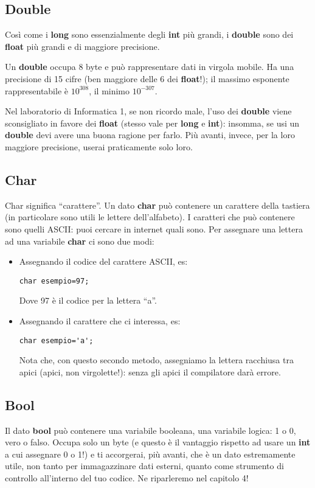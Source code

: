 	
	
	\subsection{Double}
	Così come i \textbf{long} sono essenzialmente degli \textbf{int} più grandi, i \textbf{double} sono dei \textbf{float} più grandi e di maggiore precisione.
	
	Un \textbf{double} occupa 8 byte e può rappresentare dati in virgola mobile. Ha una precisione di 15 cifre (ben maggiore delle 6 dei \textbf{float}!); il massimo esponente rappresentabile è $10^{308}$, il minimo $10^{-307}$.
	
	Nel laboratorio di Informatica 1, se non ricordo male, l'uso dei \textbf{double} viene sconsigliato in favore dei \textbf{float} (stesso vale per \textbf{long} e \textbf{int}): insomma, se usi un \textbf{double} devi avere una buona ragione per farlo. Più avanti, invece, per la loro maggiore precisione, userai praticamente solo loro.
	
	\subsection{Char}
	Char significa ``carattere''. Un dato \textbf{char} può contenere un carattere della tastiera (in particolare sono utili le lettere dell'alfabeto). I caratteri che può contenere sono quelli ASCII: puoi cercare in internet quali sono.
	Per assegnare una lettera ad una variabile \textbf{char} ci sono due modi: 
	\begin{itemize}
		\item Assegnando il codice del carattere ASCII, es:
		\begin{lstlisting}
char esempio=97;
		\end{lstlisting}
		Dove 97 è il codice per la lettera ``a''.
		\item Assegnando il carattere che ci interessa, es:
		\begin{lstlisting}
char esempio='a';
		\end{lstlisting}
		Nota che, con questo secondo metodo, assegniamo la lettera racchiusa tra apici (apici, non virgolette!): senza gli apici il compilatore darà errore.
	\end{itemize}
	
	\subsection{Bool}
	Il dato \textbf{bool} può contenere una variabile booleana, una variabile logica: 1 o 0, vero o falso. 
	Occupa solo un byte (e questo è il vantaggio rispetto ad usare un \textbf{int} a cui assegnare 0 o 1!) e ti accorgerai, più avanti, che è un dato estremamente utile, non tanto per immagazzinare dati esterni, quanto come strumento di controllo all'interno del tuo codice. Ne riparleremo nel capitolo 4!
	
